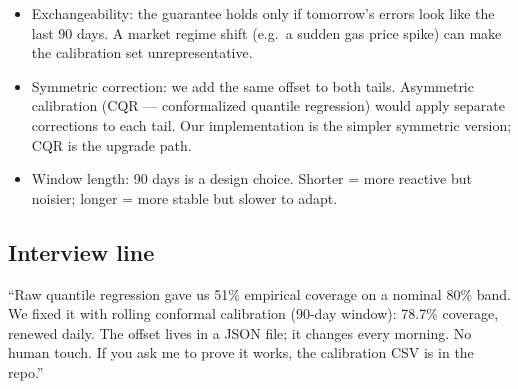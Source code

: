 \begin{itemize}
  \item Exchangeability: the guarantee holds only if tomorrow's errors
        look like the last 90 days. A market regime shift (e.g.\ a sudden
        gas price spike) can make the calibration set unrepresentative.
  \item Symmetric correction: we add the same offset to both tails.
        Asymmetric calibration (CQR --- conformalized quantile regression)
        would apply separate corrections to each tail. Our implementation
        is the simpler symmetric version; CQR is the upgrade path.
  \item Window length: 90 days is a design choice. Shorter = more
        reactive but noisier; longer = more stable but slower to adapt.
\end{itemize}

\subsection{Interview line}

``Raw quantile regression gave us 51\% empirical coverage on a nominal
80\% band. We fixed it with rolling conformal calibration (90-day window):
78.7\% coverage, renewed daily. The offset lives in a JSON file; it
changes every morning. No human touch. If you ask me to prove it works,
the calibration CSV is in the repo.''
